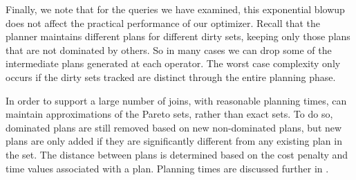 Finally, we note that for the queries we have examined, this exponential blowup does not affect the practical performance of our optimizer.
Recall that the planner maintains different plans for different dirty sets, keeping only those plans that are not dominated by others.
So in many cases we can drop some of the intermediate plans generated at each operator.
The worst case complexity only occurs if the dirty sets tracked are distinct through the entire planning phase.

In order to support a large number of joins, with reasonable planning times, \ProjectName{} can maintain approximations of the Pareto sets,
rather than exact sets. To do so, dominated plans are still removed based on new non-dominated plans, but new plans are only added
if they are significantly different from any existing plan in the set. The distance between plans is determined based on the cost penalty and time
values associated with a plan.  Planning times are discussed further in .

